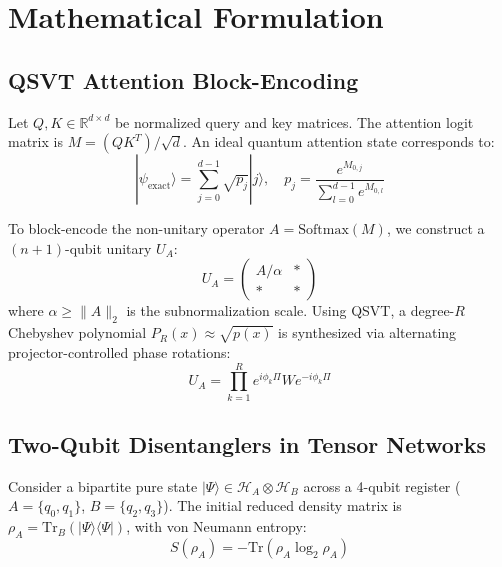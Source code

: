 \documentclass[conference]{IEEEtran}
\begin{document}
\section{Mathematical Formulation}

\subsection{QSVT Attention Block-Encoding}
Let $Q, K \in \mathbb{R}^{d \times d}$ be normalized query and key matrices. The attention logit matrix is $M = (QK^T)/\sqrt{d}$. An ideal quantum attention state corresponds to:
\begin{equation}
|\psi_{\text{exact}}\rangle = \sum_{j=0}^{d-1} \sqrt{p_j} |j\rangle, \quad p_j = \frac{e^{M_{0, j}}}{\sum_{l=0}^{d-1} e^{M_{0, l}}}
\end{equation}

To block-encode the non-unitary operator $A = \text{Softmax}(M)$, we construct a $(n+1)$-qubit unitary $U_A$:
\begin{equation}
U_A = \begin{pmatrix} A/\alpha & * \\ * & * \end{pmatrix}
\end{equation}
where $\alpha \ge \|A\|_2$ is the subnormalization scale. Using QSVT, a degree-$R$ Chebyshev polynomial $P_R(x) \approx \sqrt{p(x)}$ is synthesized via alternating projector-controlled phase rotations:
\begin{equation}
U_A = \prod_{k=1}^R e^{i \phi_k \Pi} W e^{-i \phi_k \Pi}
\end{equation}

\subsection{Two-Qubit Disentanglers in Tensor Networks}
Consider a bipartite pure state $|\Psi\rangle \in \mathcal{H}_A \otimes \mathcal{H}_B$ across a 4-qubit register ($A = \{q_0, q_1\}$, $B = \{q_2, q_3\}$). The initial reduced density matrix is $\rho_A = \text{Tr}_B(|\Psi\rangle\langle\Psi|)$, with von Neumann entropy:
\begin{equation}
S(\rho_A) = -\text{Tr}(\rho_A \log_2 \rho_A)
\end{equation}
\end{document}
